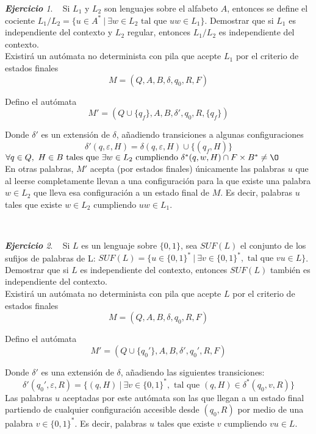 \documentclass[12pt,spanish]{article}
\theoremstyle{definition}
\theoremstyle{remark}
\newtheorem{exercise}{\textbf{Ejercicio}}%
\begin{document}
\begin{exercise}~ Si $L_1$ y $L_2$ son lenguajes sobre el alfabeto
  $A$, entonces se define el cociente
  $L_1/L_2=\{u\in A^*\ |\ \exists w \in L_2 \text{ tal que } uw \in
  L_1\}$. Demostrar que si $L_1$ es independiente del contexto y $L_2$
  regular, entonces $L_1/L_2$ es independiente del contexto. \\

  Existirá un autómata no determinista con pila que acepte $L_1$ por
  el criterio de estados finales
  \[M=(Q, A, B, \delta, q_0, R, F)\]

  Defino el autómata
  \[M'=(Q\cup\{q_f\}, A, B, \delta', q_0, R, \{q_f\})\]

  Donde $\delta'$ es un extensión de $\delta$, añadiendo transiciones
  a algunas configuraciones
  \[\delta'(q, \varepsilon, H)=\delta(q, \varepsilon, H)\cup\{(q_f,
    H)\}\]
  $\forall q\in Q,\ H \in B \text{ tales que } \exists w \in L_2
  \text{ cumpliendo } \delta^*(q, w, H)\cap F\times B^* \neq \O$ \\

  En otras palabras, $M'$ acepta (por estados finales) únicamente las
  palabras $u$ que al leerse completamente llevan a una configuración
  para la que existe una palabra $w \in L_2$ que lleva esa
  configuración a un estado final de $M$. Es decir, palabras $u$ tales
  que existe $w \in L_2$ cumpliendo $uw\in L_1$.
\end{exercise}

~

\begin{exercise}~ Si $L$ es un lenguaje sobre $\{0,1\}$, sea $SUF(L)$
  el conjunto de los sufijos de palabras de L:
  $SUF(L)=\{u\in\{0,1\}^*\ |\ \exists v \in \{0,1\}^*, \text{ tal que
  } vu \in L\}$. Demostrar que si $L$ es independiente del contexto,
  entonces $SUF(L)$ también es independiente del contexto. \\

  Existirá un autómata no determinista con pila que acepte $L$ por
  el criterio de estados finales
  \[M=(Q, A, B, \delta, q_0, R, F)\]

  Defino el autómata
  \[M'=(Q\cup\{q_0'\}, A, B, \delta', q_0', R, F)\]
  
  Donde $\delta'$ es una extensión de $\delta$, añadiendo las
  siguientes transiciones:
  \[\delta'(q_0', \varepsilon, R)=\{(q, H)\ |\ \exists v \in
    \{0,1\}^*, \text{ tal que } (q, H) \in \delta^*(q_0, v, R)\}\] Las
  palabras $u$ aceptadas por este autómata son las que llegan a un
  estado final partiendo de cualquier configuración accesible desde
  $(q_0, R)$ por medio de una palabra $v\in\{0,1\}^*$. Es decir,
  palabras $u$ tales que existe $v$ cumpliendo $vu\in L$.
\end{exercise}
\end{document}
